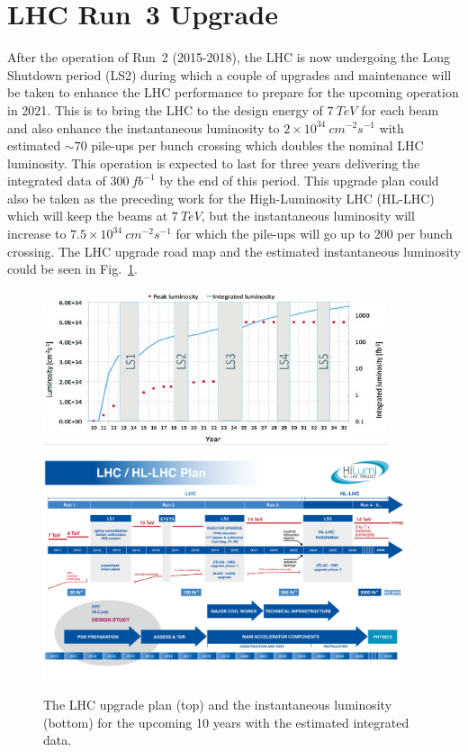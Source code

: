 \section{LHC Run~3 Upgrade}
After the operation of Run~2 (2015-2018), the LHC is now undergoing the Long Shutdown period (LS2) during which a couple of upgrades and maintenance will be taken to enhance the LHC performance to prepare for the upcoming operation in 2021. This is to bring the LHC to the design energy of $7~TeV$ for each beam and also enhance the instantaneous luminosity to $2\times10^{34}~cm^{-2}s^{-1}$ with estimated $\sim 70$ pile-ups per bunch crossing which doubles the nominal LHC luminosity. This operation is expected to last for three years delivering the integrated data of $300~fb^{-1}$ by the end of this period. This upgrade plan could also be taken as the preceding work for the High-Luminosity LHC (HL-LHC) which will keep the beams at $7~TeV$, but the instantaneous luminosity will increase to $7.5\times10^{34}~cm^{-2}s^{-1}$ for which the pile-ups will go up to 200 per bunch crossing. The LHC upgrade road map and the estimated instantaneous luminosity could be seen in Fig.~\ref{Fig:LHC_upgrade}.
\begin{figure}[!h]                
	\includegraphics[width=0.9\textwidth]{Chapter6/The-LHC-upgrade-schedule-and-associated-luminosity.jpg}
	\includegraphics[width=0.95\textwidth]{Chapter6/Schedule_HL.png}
	\begin{center}
		\caption{The LHC upgrade plan (top)\cite{schedule} and the instantaneous luminosity (bottom)\cite{Atlas:2019qfx} for the upcoming 10 years with the estimated integrated data.}
		\label{Fig:LHC_upgrade}            
	\end{center}
\end{figure} 
